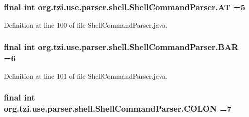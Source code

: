 \hypertarget{classorg_1_1tzi_1_1use_1_1parser_1_1shell_1_1_shell_command_parser_a50ab4e5d73f95d12c4dcaceb4b569318}{
\subsubsection[{A\-T}]{\setlength{\rightskip}{0pt plus 5cm}final int org.\-tzi.\-use.\-parser.\-shell.\-Shell\-Command\-Parser.\-A\-T =5\hspace{0.3cm}{\ttfamily [static]}}}\label{classorg_1_1tzi_1_1use_1_1parser_1_1shell_1_1_shell_command_parser_a50ab4e5d73f95d12c4dcaceb4b569318}


Definition at line 100 of file Shell\-Command\-Parser.\-java.

\hypertarget{classorg_1_1tzi_1_1use_1_1parser_1_1shell_1_1_shell_command_parser_a60abe1a52ab6609b3a189ff6dea6721b}{
\subsubsection[{B\-A\-R}]{\setlength{\rightskip}{0pt plus 5cm}final int org.\-tzi.\-use.\-parser.\-shell.\-Shell\-Command\-Parser.\-B\-A\-R =6\hspace{0.3cm}{\ttfamily [static]}}}\label{classorg_1_1tzi_1_1use_1_1parser_1_1shell_1_1_shell_command_parser_a60abe1a52ab6609b3a189ff6dea6721b}


Definition at line 101 of file Shell\-Command\-Parser.\-java.

\hypertarget{classorg_1_1tzi_1_1use_1_1parser_1_1shell_1_1_shell_command_parser_a7b0717d5b709dac08fd90f03d9d5ae68}{
\subsubsection[{C\-O\-L\-O\-N}]{\setlength{\rightskip}{0pt plus 5cm}final int org.\-tzi.\-use.\-parser.\-shell.\-Shell\-Command\-Parser.\-C\-O\-L\-O\-N =7\hspace{0.3cm}{\ttfamily [static]}}}\label{classorg_1_1tzi_1_1use_1_1parser_1_1shell_1_1_shell_command_parser_a7b0717d5b709dac08fd90f03d9d5ae68}



